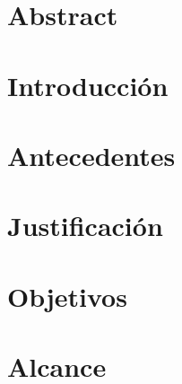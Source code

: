 \documentclass[11pt, letterpaper, twoside, openright]{report}
\newcommand{\defaultparformat}[1]{
	{\setlength{\parskip}{2ex}
     }
}
\begin{document}
	\chapter*{Abstract}
	\ifdefined\parpordefecto
		\defaultparformat{c-abstract}
	\else
		
	\fi
\fi

\ifdefined\CAPintroduccion
	\newpage
	\cleardoublepage
	\setcounter{page}{1}
	\chapter{Introducción}
	\ifdefined\parpordefecto
		\defaultparformat{d-introduccion}
	\else
		
	\fi
\fi

\ifdefined\CAPantecedentes
	\newpage
	\chapter{Antecedentes}
	\ifdefined\parpordefecto
    	\defaultparformat{e-antecedentes}
    \else
    	
    \fi  
\fi

\ifdefined\CAPjustificacion
	\newpage
	\chapter{Justificación}
	\ifdefined\parpordefecto
		\defaultparformat{f-justificacion}
	\else
		
	\fi
\fi

\ifdefined\CAPobjetivos
	\newpage
	\chapter{Objetivos}
	\ifdefined\parpordefecto
		\defaultparformat{g-objetivos}
	\else
		
	\fi
\fi

\ifdefined\CAPalcance
	\newpage
	\chapter{Alcance}
	\ifdefined\parpordefecto
    	\defaultparformat{h-alcance}
    \else
    	
    \fi 
\fi
\end{document}
